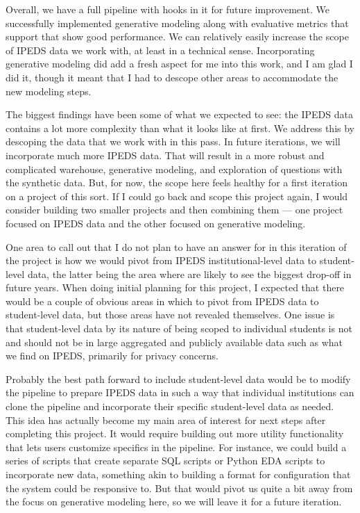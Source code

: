 \documentclass[sigconf, authorversion, nonacm]{acmart}
\begin{document}
    Overall, we have a full pipeline with hooks in it for future improvement. We successfully implemented generative modeling along with evaluative metrics that support that show good performance. We can relatively easily increase the scope of IPEDS data we work with, at least in a technical sense. Incorporating generative modeling did add a fresh aspect for me into this work, and I am glad I did it, though it meant that I had to descope other areas to accommodate the new modeling steps.

    The biggest findings have been some of what we expected to see: the IPEDS data contains a lot more complexity than what it looks like at first. We address this by descoping the data that we work with in this pass. In future iterations, we will incorporate much more IPEDS data. That will result in a more robust and complicated warehouse, generative modeling, and exploration of questions with the synthetic data. But, for now, the scope here feels healthy for a first iteration on a project of this sort. If I could go back and scope this project again, I would consider building two smaller projects and then combining them --- one project focused on IPEDS data and the other focused on generative modeling.

    One area to call out that I do not plan to have an answer for in this iteration of the project is how we would pivot from IPEDS institutional-level data to student-level data, the latter being the area where are likely to see the biggest drop-off in future years. When doing initial planning for this project, I expected that there would be a couple of obvious areas in which to pivot from IPEDS data to student-level data, but those areas have not revealed themselves. One issue is that student-level data by its nature of being scoped to individual students is not and should not be in large aggregated and publicly available data such as what we find on IPEDS, primarily for privacy concerns.

    Probably the best path forward to include student-level data would be to modify the pipeline to prepare IPEDS data in such a way that individual institutions can clone the pipeline and incorporate their specific student-level data as needed. This idea has actually become my main area of interest for next steps after completing this project. It would require building out more utility functionality that lets users customize specifics in the pipeline. For instance, we could build a series of scripts that create separate SQL scripts or Python EDA scripts to incorporate new data, something akin to building a format for configuration that the system could be responsive to. But that would pivot us quite a bit away from the focus on generative modeling here, so we will leave it for a future iteration.
\end{document}
